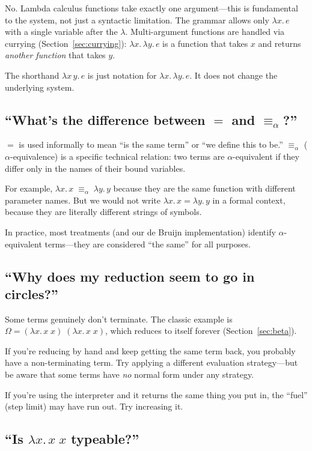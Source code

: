 \documentclass[11pt,a4paper]{article}
\theoremstyle{definition}
\newcommand{\lam}{\lambda}
\newcommand{\aeq}{\equiv_\alpha}
\begin{document}
No. Lambda calculus functions take exactly one argument---this is fundamental to
the system, not just a syntactic limitation. The grammar allows only $\lam x.\,
e$ with a single variable after the $\lam$. Multi-argument functions are
handled via currying (Section~\ref{sec:currying}): $\lam x.\, \lam y.\, e$ is
a function that takes $x$ and returns \emph{another function} that takes $y$.

The shorthand $\lam x\, y.\, e$ is just notation for $\lam x.\, \lam y.\, e$.
It does not change the underlying system.

\subsection{``What's the difference between $=$ and $\aeq$?''}

$=$ is used informally to mean ``is the same term'' or ``we define this to be.''
$\aeq$ ($\alpha$-equivalence) is a specific technical relation: two terms are
$\alpha$-equivalent if they differ only in the names of their bound variables.

For example, $\lam x.\, x \;\aeq\; \lam y.\, y$ because they are the same
function with different parameter names. But we would not write
$\lam x.\, x = \lam y.\, y$ in a formal context, because they are literally
different strings of symbols.

In practice, most treatments (and our de Bruijn implementation) identify
$\alpha$-equivalent terms---they are considered ``the same'' for all purposes.

\subsection{``Why does my reduction seem to go in circles?''}

Some terms genuinely don't terminate. The classic example is $\Omega = (\lam
x.\, x\;x)\;(\lam x.\, x\;x)$, which reduces to itself forever
(Section~\ref{sec:beta}).

If you're reducing by hand and keep getting the same term back, you probably
have a non-terminating term. Try applying a different evaluation strategy---but
be aware that some terms have \emph{no} normal form under any strategy.

If you're using the interpreter and it returns the same thing you put in, the
``fuel'' (step limit) may have run out. Try increasing it.

\subsection{``Is $\lam x.\, x\; x$ typeable?''}
\end{document}
